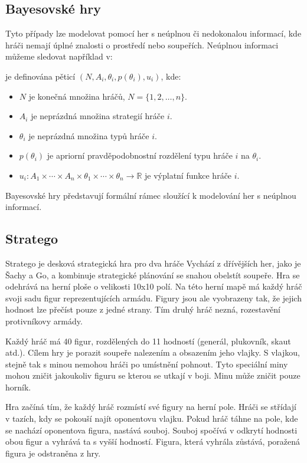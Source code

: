 \subsection{Bayesovské hry}
Tyto případy lze modelovat pomocí her s neúplnou či nedokonalou informací, kde hráči nemají úplné znalosti o prostředí nebo soupeřích.
Neúplnou informaci můžeme sledovat například v:

\begin{definition}
\cite{Y_Narahari} je definována pěticí $(N, A_i, \theta_i, p(\theta_i), u_i)$, kde:

\begin{itemize}
\item $N$ je konečná množina hráčů, $N = \{1, 2, \ldots, n\}$.
\item $A_i$ je neprázdná množina strategií hráče $i$.
\item $\theta_i$ je neprázdná množina typů hráče $i$.
\item $p(\theta_i)$ je apriorní pravděpodobnostní rozdělení typu hráče $i$ na $\theta_i$.
\item $u_i: A_1 \times \cdots \times A_n \times \theta_1 \times \cdots \times \theta_n \rightarrow \mathbb{R}$ je výplatní funkce hráče $i$.
\end{itemize}
\end{definition}

Bayesovské hry představují formální rámec sloužící k modelování her s neúplnou informací.

\subsection{Stratego}\label{subsec:stratego}
Stratego je desková strategická hra pro dva hráče
Vychází z dřívějších her, jako je Šachy a Go, a kombinuje strategické plánování se snahou obelstít soupeře.
Hra se odehrává na herní ploše o velikosti 10x10 polí.
Na této herní mapě má každý hráč svoji sadu figur reprezentujících armádu.
Figury jsou ale vyobrazeny tak, že jejich hodnost lze přečíst pouze z jedné strany.
Tím druhý hráč nezná, rozestavění protivníkovy armády.

Každý hráč má 40 figur, rozdělených do 11 hodností (generál, plukovník, skaut atd.).
Cílem hry je porazit soupeře nalezením a obsazením jeho vlajky.
S vlajkou, stejně tak s minou nemohou hráči po umístnění pohnout.
Tyto speciální miny mohou zničit jakoukoliv figuru se kterou se utkají v boji.
Minu může zničit pouze horník.

Hra začíná tím, že každý hráč rozmístí své figury na herní pole.
Hráči se střídají v tazích, kdy se pokouší najít oponentovu vlajku.
Pokud hráč táhne na pole, kde se nachází oponentova figura, nastává souboj.
Souboj spočívá v odkrytí hodnosti obou figur a vyhrává ta s vyšší hodností.
Figura, která vyhrála zůstává, poražená figura je odstraněna z hry.

